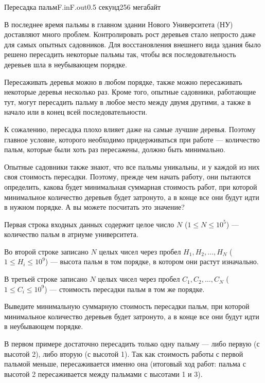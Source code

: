 \begin{problem}{Пересадка пальм}{F.in}{F.out}{0.5 секунд}{256 мегабайт}

В последнее время пальмы в главном здании Нового Университета (НУ) доставляют много проблем. Контролировать рост деревьев стало непросто даже для самых опытных садовников. Для восстановления внешнего вида здания было решено пересадить некоторые пальмы так, чтобы вся последовательность деревьев шла в неубывающем порядке.

Пересаживать деревья можно в любом порядке, также можно пересаживать некоторые деревья несколько раз. Кроме того, опытные садовники, работающие тут, могут пересадить пальму в любое место между двумя другими, а также в начало или в конец всей последовательности.

К сожалению, пересадка плохо влияет даже на самые лучшие деревья. Поэтому главное условие, которого необходимо придерживаться при работе — количество пальм, которые были хоть раз пересажены, должно быть минимально. 

Опытные садовники также знают, что все пальмы уникальны, и у каждой из них своя стоимость пересадки. Поэтому, прежде чем начать работу, они пытаются определить, какова будет минимальная суммарная стоимость работ, при которой минимальное количество деревьев будет затронуто, а в конце все они будут идти в нужном порядке. А вы можете посчитать это значение?



\InputFile
Первая строка входных данных содержит целое число $N$ ($1 \le N \le 10^5$) --- количество пальм в атриуме университета. 

Во второй строке записано $N$ целых чисел через пробел $H_1,H_2,\dots,H_N$ ($1 \le H_i \le 10^9$) --- высота пальм в том порядке, в котором они растут изначально.

В третьей строке записано $N$ целых чисел через пробел $C_1,C_2,\dots,C_N$ ($1 \le C_i \le 10^9$) --- стоимость пересадки пальм в том же порядке.


\OutputFile
Выведите минимальную суммарную стоимость пересадки пальм, при которой минимальное количество деревьев будет затронуто, а в конце все они будут идти в неубывающем порядке.

\Examples

\begin{example}
%
\end{example}


В первом примере достаточно пересадить только одну пальму --- либо первую (с высотой 2), либо вторую (с высотой 1). Так как стоимость работы с первой пальмой меньше, пересаживается именно она (итоговый ход работ: пальма с высотой 2 пересаживается между пальмами с высотами 1 и 3). 


\end{problem}
